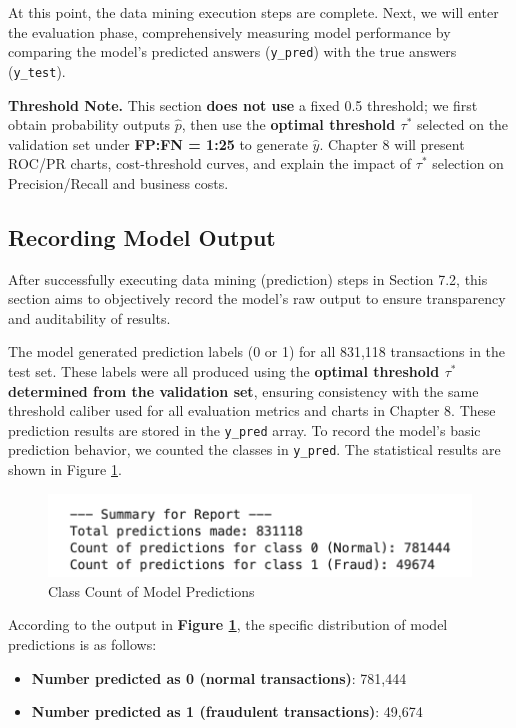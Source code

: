 \documentclass[sigplan,screen]{acmart}
\begin{document}
At this point, the data mining execution steps are complete. Next, we will enter the evaluation phase, comprehensively measuring model performance by comparing the model's predicted answers (\texttt{y\_pred}) with the true answers (\texttt{y\_test}).

\textbf{Threshold Note.} This section \textbf{does not use} a fixed 0.5 threshold; we first obtain probability outputs $\hat{p}$, then use the \textbf{optimal threshold $\tau^*$} selected on the validation set under \textbf{FP:FN = 1:25} to generate $\hat{y}$. Chapter 8 will present ROC/PR charts, cost-threshold curves, and explain the impact of $\tau^*$ selection on Precision/Recall and business costs.

\subsection{Recording Model Output}

After successfully executing data mining (prediction) steps in Section 7.2, this section aims to objectively record the model's raw output to ensure transparency and auditability of results.

The model generated prediction labels (0 or 1) for all 831,118 transactions in the test set. These labels were all produced using the \textbf{optimal threshold $\tau^*$ determined from the validation set}, ensuring consistency with the same threshold caliber used for all evaluation metrics and charts in Chapter 8. These prediction results are stored in the \texttt{y\_pred} array. To record the model's basic prediction behavior, we counted the classes in \texttt{y\_pred}. The statistical results are shown in Figure \ref{fig:prediction_class_count}.

\begin{figure}[h!]
    \centering
    \includegraphics[width=0.9\columnwidth]{7.3.png}
    \caption{Class Count of Model Predictions}
    \label{fig:prediction_class_count}
\end{figure}

According to the output in \textbf{Figure \ref{fig:prediction_class_count}}, the specific distribution of model predictions is as follows:

\begin{itemize}
\item \textbf{Number predicted as 0 (normal transactions)}: 781,444
\item \textbf{Number predicted as 1 (fraudulent transactions)}: 49,674
\end{itemize}
\end{document}
